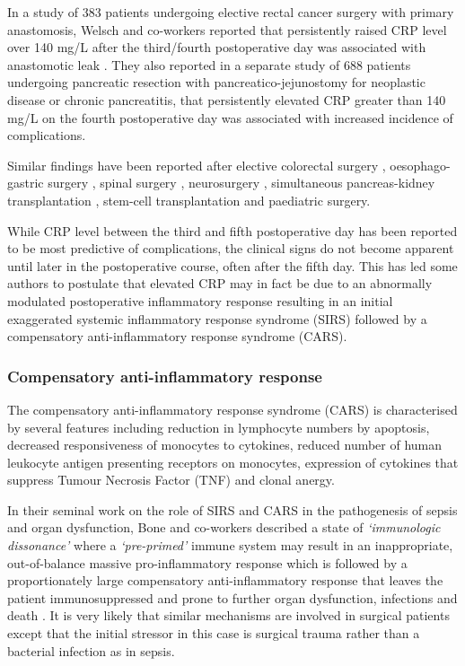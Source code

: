 In a study of 383 patients undergoing elective rectal cancer surgery with primary anastomosis, Welsch and co-workers reported that persistently raised CRP level over 140 mg/L after the third/fourth postoperative day was associated with anastomotic leak \parencite{welsch_c-reactive_2007}. 
They also reported in a separate study of 688 patients undergoing pancreatic resection with pancreatico-jejunostomy for neoplastic disease or chronic pancreatitis, that persistently elevated CRP greater than 140 mg/L on the fourth postoperative day was associated with increased incidence of complications. 

Similar findings have been reported after elective colorectal surgery \parencite{ortega-deballon_c-reactive_2010, woeste_increased_2010}, oesophago-gastric surgery \parencite{dutta_persistent_2011}, spinal surgery \parencite{meyer_c-reactive_1995,mok_use_2008}, neurosurgery \parencite{al-jabi_value_2010}, simultaneous pancreas-kidney transplantation \parencite{wullstein_high_2004}, stem-cell transplantation \parencite{mcneer_early_2010} and paediatric surgery\parencite{laporta_baez_c-reactive_2011}.

While CRP level between the third and fifth postoperative day has been reported to be most predictive of complications, the clinical signs do not become apparent until later in the postoperative course, often after the fifth day. 
This has led some authors to postulate that elevated CRP may in fact be due to an abnormally modulated postoperative inflammatory response resulting in an initial exaggerated systemic inflammatory response syndrome (SIRS) followed by a compensatory anti-inflammatory response syndrome (CARS). 

\subsubsection{Compensatory anti-inflammatory response}
The compensatory anti-inflammatory response syndrome (CARS) is characterised by several features including reduction in lymphocyte numbers by apoptosis, decreased responsiveness of monocytes to cytokines, reduced number of human leukocyte antigen presenting receptors on monocytes, expression of cytokines that suppress Tumour Necrosis Factor (TNF) and clonal anergy.

In their seminal work on the role of SIRS and CARS in the pathogenesis of sepsis and organ dysfunction, Bone and co-workers described a state of \textit{`immunologic dissonance'} where a \textit{`pre-primed'} immune system may result in an inappropriate, out-of-balance massive pro-inflammatory response which is followed by a proportionately large compensatory anti-inflammatory response that leaves the patient immunosuppressed and prone to further organ dysfunction, infections and death \parencite{bone_sepsis:_1997, bone_immunologic_1996}. 
It is very likely that similar mechanisms are involved in surgical patients except that the initial stressor in this case is surgical trauma rather than a bacterial infection as in sepsis. 

